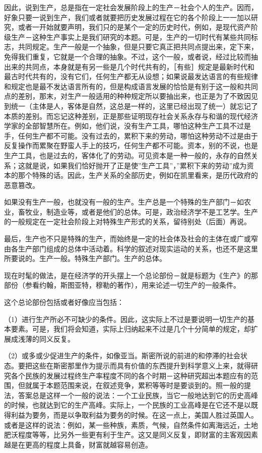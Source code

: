 \documentclass[a4paper,twoside,12pt,AutoFakeBold]{ctexart}
\begin{document}
因此，说到生产，总是指在一定社会发展阶段上的生产－社会个人的生产。因而，好象只要一说到生产，我们或者就要把历史发展过程在它的各个阶段上一一加以研究，或者一开始就要声明，我们只的是某个一定的历史时代，例如，是现代资产阶级生产－这种生产事实上是我们研究的本题。可是，生产的一切时代有某些共同标志，共同规定。生产一般是一个抽象，但是只要它真正把共同点提出来，定下来，免得我们重复，它就是一个合理的抽象。不过，这个一般，或者说，经过比较而抽出来的共同点，本身就是有另一些是几个时代共有的，［有些］规定是最新时代和最古时代共有的，没有它们，任何生产都无从设想；如果说最发达语言的有些规律和规定也是最不发达语言所有的，但是构成语言发展的恰恰是有别于这一般和共同点的差别，那末，对生产一般适用的种种规定所以要抽出来，也正是为了不致因见到统一（主体是人，客体是自然，这总是一样的，这里已经出现了统一）就忘记了本质的差别。而忘记这种差别，正是那些证明现存社会关系永存与和谐的现代经济学家的全部智慧所在。例如，他们说，没有生产工具，哪怕这种生产工具不过是手，任何生产都不可能。没有过去的，累积下来的劳动，哪怕这种劳动不过是由于反复操作而累聚在野蛮人手上的技巧，任何生产都不可能。资本，别的不说，也是生产工具，也是过去的，客体化了的劳动。可见资本是一种一般的，永存的自然关系；这就是说，如果我们恰好抛开了正是使”生产工具”，”累积下来的劳动”成为资本的那个特殊的话。因此，生产关系的全部历史，例如在凯里看来，是历代政府的恶意篡改。

如果没有生产一般，也就没有一般的生产。生产总是一个特殊的生产部门－如农业，畜牧业，制造业等，或者是他们的总体。可是，政治经济学不是工艺学。生产的一般规定在一定社会阶段上对特殊生产形式的关系，留待别处（后面）再说。

最后，生产也不只是特殊的生产，而始终是一定的社会体及社会的主体在或广或窄由各生产部门组成的总体中活动着。科学的叙述对现实运动的关系，也还不是这里所要说的。生产一般。特殊生产部门。生产的总体。

现在时髦的做法，是在经济学的开头摆上一个总论部份－就是标题为《生产》的那部份（参看约翰，斯图亚特，穆勒的著作），用来论述一切生产的一般条件。

这个总论部份包括或者好像应当包括：

（1）进行生产所必不可缺少的条件。因此，这实际上不过是要说明一切生产的基本要素。可是，我们将会知道，实际上归纳起来不过是几个十分简单的规定，却扩展成浅薄的同义反复。

（2）或多或少促进生产的条件，如像亚当。斯密所说的前进的和停滞的社会状态。要把这些在斯密那里作为提示而具有价值的东西提升到科学意义上来，就得研究各个民族的发展过程终生产率程度不同的各个时期－这种研究超出本题应有的范围，但就属于本题范围来说，在叙述竞争，累积等等时是要谈到的。照一般的提法，答案总是这样一个一般的说法：一个工业民族，当它一般地达到它的历史高峰的时候，也就达到它的生产高峰。实际上，一个民族的工业高峰是在它还不是以既得利益为要务，而是以争取利益为要务的时候。在这一点上，美国人胜过英国人。或者是这样的说法：例如，某一些种族，素质，气候，自然条件如离海远近，土地肥沃程度等等，比另外一些更有利于生产。这又是同义反复，即财富的主客观因素越是在更高的程度上具备，财富就越容易创造。
\end{document}

